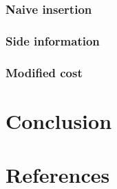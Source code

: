 \documentclass[12pt]{article}
\begin{document}
\subsubsection{Naive insertion}
\subsubsection{Side information}
\subsubsection{Modified cost}

\section*{Conclusion}

\section*{References}
\end{document}
